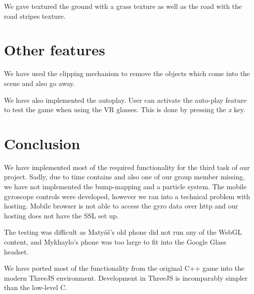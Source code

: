 \documentclass[a4paper,10pt, twocolumn]{article}
\begin{document}
We gave textured the ground with a grass texture as well as the road with the road stripes texture.

\section{Other features}
We have used the clipping mechanism to remove the objects which come into the scene and also go away. 

We have also implemented the autoplay. User can activate the auto-play feature to test the game when using the VR glasses. This is done by pressing the \emph{x} key.

\section*{Conclusion}
We have implemented most of the required functionality for the third task of our project. Sadly, due to time contains and also one of our group member missing, we have not implemented the bump-mapping and a particle system. The mobile gyroscope controls were developed, however we ran into a technical problem  with hosting. Mobile browser is not able to access the gyro data over http and our hosting does not have the SSL set up. 

The testing was difficult as Matyáš's old phone did not run any of the WebGL content, and Mykhaylo's phone was too large to fit into the Google Glass headset. 

We have ported most of the functionality from the original C++ game into the modern ThreeJS environment. Development in ThreeJS is incomparably simpler than the low-level C. 
\end{document}
